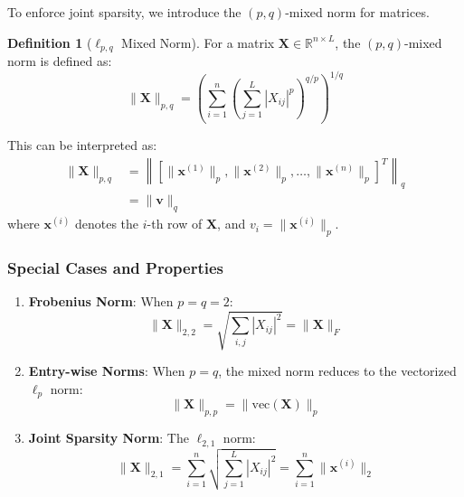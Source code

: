 \documentclass[12pt]{article}
\renewcommand{\vec}[1]{\mathbf{#1}}
\theoremstyle{definition}
\newtheorem{definition}{Definition}[section]
\begin{document}
To enforce joint sparsity, we introduce the $(p,q)$-mixed norm for matrices.

\begin{definition}[$\ell_{p,q}$ Mixed Norm]
    \label{def:mixed_norm}
    For a matrix $\vec{X} \in \mathbb{R}^{n \times L}$, the $(p,q)$-mixed norm is defined as:
    \begin{equation}
        \|\vec{X}\|_{p,q} = \left(\sum_{i=1}^{n} \left(\sum_{j=1}^{L} |X_{ij}|^p\right)^{q/p}\right)^{1/q}
        \label{eq:mixed_norm_def}
    \end{equation}
\end{definition}

This can be interpreted as:
\begin{align}
    \|\vec{X}\|_{p,q} & = \left\|\left[\|\vec{x}^{(1)}\|_p, \|\vec{x}^{(2)}\|_p, \ldots, \|\vec{x}^{(n)}\|_p\right]^T\right\|_q \\
                      & = \|\vec{v}\|_q
\end{align}
where $\vec{x}^{(i)}$ denotes the $i$-th row of $\vec{X}$, and $v_i = \|\vec{x}^{(i)}\|_p$.

\subsubsection{Special Cases and Properties}

\begin{enumerate}
    \item \textbf{Frobenius Norm}: When $p = q = 2$:
          \begin{equation}
              \|\vec{X}\|_{2,2} = \sqrt{\sum_{i,j} |X_{ij}|^2} = \|\vec{X}\|_F
          \end{equation}

    \item \textbf{Entry-wise Norms}: When $p = q$, the mixed norm reduces to the vectorized $\ell_p$ norm:
          \begin{equation}
              \|\vec{X}\|_{p,p} = \|\text{vec}(\vec{X})\|_p
          \end{equation}

    \item \textbf{Joint Sparsity Norm}: The $\ell_{2,1}$ norm:
          \begin{equation}
              \|\vec{X}\|_{2,1} = \sum_{i=1}^{n} \sqrt{\sum_{j=1}^{L} |X_{ij}|^2} = \sum_{i=1}^{n} \|\vec{x}^{(i)}\|_2
              \label{eq:l21_norm}
          \end{equation}
\end{enumerate}
\end{document}
